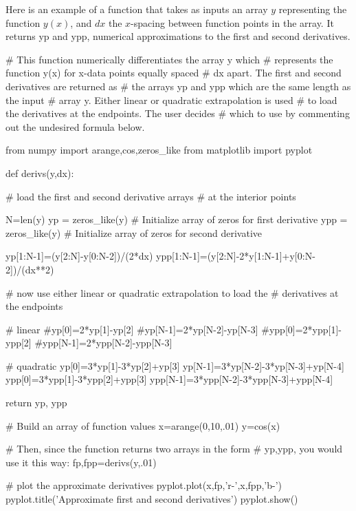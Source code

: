 Here is an example of a function that takes as inputs an array $y$
representing the function $y(x)$, and $dx$ the $x$-spacing between function
points in the array. It returns {\code yp} and {\code ypp}, numerical
approximations to the first and second derivatives. 

\begin{codeexample}
\begin{VerbatimOut}{\listingFile}

# This function numerically differentiates the array y which
# represents the function y(x) for x-data points equally spaced
# dx apart.  The first and second derivatives are returned as
# the arrays yp and ypp which are the same length as the input
# array y.  Either linear or quadratic extrapolation is used
# to load the derivatives at the endpoints.  The user decides
# which to use by commenting out the undesired formula below.

from numpy import arange,cos,zeros_like
from matplotlib import pyplot

def derivs(y,dx):

    # load the first and second derivative arrays
    # at the interior points

    N=len(y)
    yp = zeros_like(y)  # Initialize array of zeros for first derivative
    ypp = zeros_like(y)  # Initialize array of zeros for second derivative

    yp[1:N-1]=(y[2:N]-y[0:N-2])/(2*dx)
    ypp[1:N-1]=(y[2:N]-2*y[1:N-1]+y[0:N-2])/(dx**2)

    # now use either linear or quadratic extrapolation to load the
    # derivatives at the endpoints


    # linear
    #yp[0]=2*yp[1]-yp[2]
    #yp[N-1]=2*yp[N-2]-yp[N-3]
    #ypp[0]=2*ypp[1]-ypp[2]
    #ypp[N-1]=2*ypp[N-2]-ypp[N-3]

    # quadratic
    yp[0]=3*yp[1]-3*yp[2]+yp[3]
    yp[N-1]=3*yp[N-2]-3*yp[N-3]+yp[N-4]
    ypp[0]=3*ypp[1]-3*ypp[2]+ypp[3]
    ypp[N-1]=3*ypp[N-2]-3*ypp[N-3]+ypp[N-4]

    return yp, ypp


# Build an array of function values
x=arange(0,10,.01)
y=cos(x)

# Then, since the function returns two arrays in the form
# yp,ypp, you would use it this way:
fp,fpp=derivs(y,.01)

# plot the approximate derivatives
pyplot.plot(x,fp,'r-',x,fpp,'b-')
pyplot.title('Approximate first and second derivatives')
pyplot.show()
\end{VerbatimOut}
\end{codeexample}

